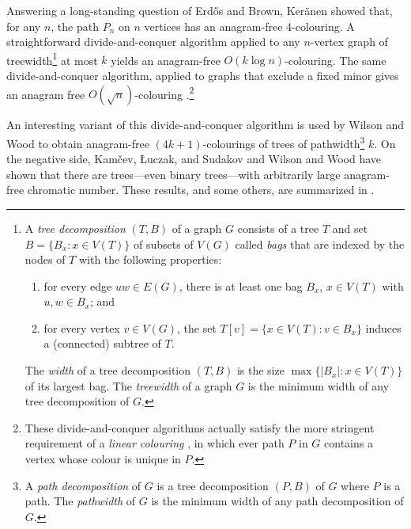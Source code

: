 \documentclass{patmorin}
\begin{document}
Answering a long-standing question of Erd\H{o}s and Brown, Ker\"anen
\cite{keranen:abelian} showed that, for any $n$, the path $P_n$ on
$n$ vertices has an anagram-free 4-colouring.  A straightforward
divide-and-conquer algorithm applied to any $n$-vertex graph of
treewidth\footnote{A \emph{tree decomposition} $(T,B)$ of a graph $G$ consists of a tree $T$ and set $B=\{B_x : x\in V(T)\}$ of subsets of $V(G)$ called \emph{bags} that are indexed by the nodes of $T$ with the following properties:
\begin{enumerate}
   \item  for every edge $uw\in E(G)$, there is at least one bag $B_x$, $x\in V(T)$ with $u,w\in B_x$; and
   \item for every vertex $v\in V(G)$, the set $T[v]=\{x\in V(T): v\in B_x\}$ induces a (connected) subtree of $T$.
\end{enumerate}
The \emph{width} of a tree decomposition $(T,B)$ is the size
$\max\{|B_x|:x\in V(T)\}$ of its largest bag.  The \emph{treewidth}
of a graph $G$ is the minimum width of any tree decomposition of $G$.}
 at most $k$ yields an anagram-free $O(k\log n)$-colouring.
The same divide-and-conquer algorithm, applied to graphs that
exclude a fixed minor gives an anagram free $O(\sqrt{n})$-colouring
\cite{kamcev.luczak.ea:anagram-free}.\footnote{These divide-and-conquer algorithms
actually satisfy the more stringent requirement of a \emph{linear
colouring} \cite{kun.obrien.ea:treedepth}, 
in which ever path $P$ in $G$ contains a vertex
whose colour is unique in $P$.}

An interesting variant
of this divide-and-conquer algorithm is used by Wilson and Wood
\cite{wilson.wood:anagram-free} to obtain anagram-free $(4k+1)$-colourings
of trees of pathwidth\footnote{A \emph{path decomposition} of $G$ is a tree decomposition $(P,B)$ of $G$ where $P$ is a path.  The \emph{pathwidth} of $G$ is the minimum width of any path decomposition of $G$.}
 $k$.  On the negative side, Kamčev, Łuczak,
and Sudakov \cite{kamcev.luczak.ea:anagram-free} and Wilson and Wood
\cite{wilson.wood:anagram-free} have shown that there are trees---even
binary trees---with arbitrarily large anagram-free chromatic number.
These results, and some others, are summarized in .
\end{document}
